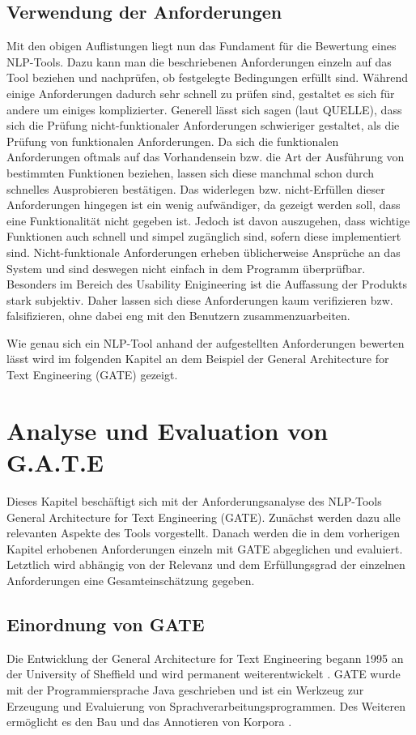 \documentclass[12pt]{report}
\begin{document}
\section{Verwendung der Anforderungen}
Mit den obigen Auflistungen liegt nun das Fundament für die Bewertung eines NLP-Tools. Dazu kann man die beschriebenen Anforderungen einzeln auf das Tool beziehen und nachprüfen, ob festgelegte Bedingungen erfüllt sind. Während einige Anforderungen dadurch sehr schnell zu prüfen sind, gestaltet es sich für andere um einiges komplizierter. Generell lässt sich sagen (laut QUELLE), dass sich die Prüfung nicht-funktionaler Anforderungen schwieriger gestaltet, als die Prüfung von funktionalen Anforderungen. Da sich die funktionalen Anforderungen oftmals auf das Vorhandensein bzw. die Art der Ausführung von bestimmten Funktionen beziehen, lassen sich diese manchmal schon durch schnelles Ausprobieren bestätigen. Das widerlegen bzw. nicht-Erfüllen dieser Anforderungen hingegen ist ein wenig aufwändiger, da gezeigt werden soll, dass eine Funktionalität nicht gegeben ist. Jedoch ist davon auszugehen, dass wichtige Funktionen auch schnell und simpel zugänglich sind, sofern diese implementiert sind. 
Nicht-funktionale Anforderungen erheben üblicherweise Ansprüche an das System und sind deswegen nicht einfach in dem Programm überprüfbar. Besonders im Bereich des Usability Enigineering ist die Auffassung der Produkts stark subjektiv. Daher lassen sich diese Anforderungen kaum verifizieren bzw. falsifizieren, ohne dabei eng mit den Benutzern zusammenzuarbeiten. 

Wie genau sich ein NLP-Tool anhand der aufgestellten Anforderungen bewerten lässt wird im folgenden Kapitel an dem Beispiel der General Architecture for Text Engineering (GATE) gezeigt. 

\chapter{Analyse und Evaluation von G.A.T.E}
Dieses Kapitel beschäftigt sich mit der Anforderungsanalyse des NLP-Tools General Architecture for Text Engineering (GATE). Zunächst werden dazu alle relevanten Aspekte des Tools vorgestellt. Danach werden die in dem vorherigen Kapitel erhobenen Anforderungen einzeln mit GATE abgeglichen und evaluiert. Letztlich wird abhängig von der Relevanz und dem Erfüllungsgrad der einzelnen Anforderungen eine Gesamteinschätzung gegeben.

\section{Einordnung von GATE}
Die Entwicklung der General Architecture for Text Engineering begann 1995 an der University of Sheffield und wird permanent weiterentwickelt \cite{cgw95}. GATE wurde mit der Programmiersprache Java geschrieben  und ist ein Werkzeug zur Erzeugung und Evaluierung von Sprachverarbeitungsprogrammen. Des Weiteren ermöglicht es den Bau und das Annotieren von Korpora \cite{cmb02}. 
\end{document}
